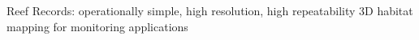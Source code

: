 Reef Records: operationally simple, high resolution, high repeatability 3D habitat mapping for monitoring applications 